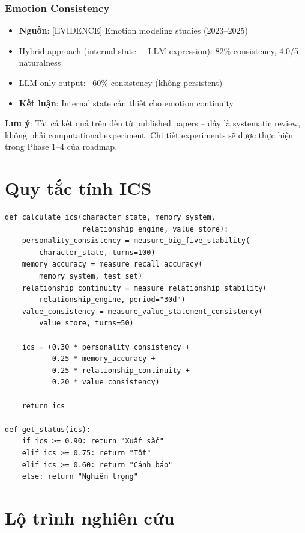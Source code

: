 \documentclass[10pt,leqno]{amsart}
\begin{document}
\subsubsection{Emotion Consistency}
\begin{itemize}
    \item \textbf{Nguồn}: [EVIDENCE] Emotion modeling studies (2023--2025)
    \item Hybrid approach (internal state + LLM expression): 82\% consistency, 4.0/5 naturalness
    \item LLM-only output: ~60\% consistency (không persistent)
    \item \textbf{Kết luận}: Internal state cần thiết cho emotion continuity
\end{itemize}

\textbf{Lưu ý}: Tất cả kết quả trên đến từ published papers -- đây là systematic review, không phải computational experiment. Chi tiết experiments sẽ được thực hiện trong Phase 1--4 của roadmap.

\section{Quy tắc tính ICS}

\begin{verbatim}
def calculate_ics(character_state, memory_system,
                  relationship_engine, value_store):
    personality_consistency = measure_big_five_stability(
        character_state, turns=100)
    memory_accuracy = measure_recall_accuracy(
        memory_system, test_set)
    relationship_continuity = measure_relationship_stability(
        relationship_engine, period="30d")
    value_consistency = measure_value_statement_consistency(
        value_store, turns=50)

    ics = (0.30 * personality_consistency +
           0.25 * memory_accuracy +
           0.25 * relationship_continuity +
           0.20 * value_consistency)

    return ics

def get_status(ics):
    if ics >= 0.90: return "Xuất sắc"
    elif ics >= 0.75: return "Tốt"
    elif ics >= 0.60: return "Cảnh báo"
    else: return "Nghiêm trọng"
\end{verbatim}

\section{Lộ trình nghiên cứu}
\end{document}
